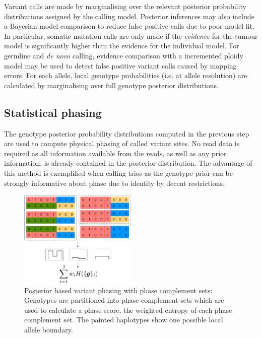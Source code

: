\documentclass[notitlepage, twocolumn]{article}
\begin{document}
Variant calls are made by marginalising over the relevant posterior probability distributions assigned by the calling model. Posterior inferences may also include a Bayesian model comparison to reduce false positive calls due to poor model fit. In particular, somatic mutation calls are only made if the \emph{evidence} for the tumour model is significantly higher than the evidence for the individual model. For germline and \textit{de novo} calling, evidence comparison with a incremented ploidy model may be used to detect false positive variant calls caused by mapping errors. For each allele, local genotype probabilities (i.e. at allele resolution) are calculated by marginalising over full genotype posterior distributions.

\subsection*{Statistical phasing}

The genotype posterior probability distributions computed in the previous step are used to compute physical phasing of called variant sites. No read data is required as all information available from the reads, as well as any prior information, is already contained in the posterior distribution. The advantage of this method is exemplified when calling trios as the genotype prior can be strongly informative about phase due to identity by decent restrictions.

\begin{figure}[ht]
\centering
\includegraphics[width=0.5\textwidth]{figures/phasing}
\caption{Posterior based variant phasing with phase complement sets: Genotypes are partitioned into phase complement sets which are used to calculate a phase score, the weighted entropy of each phase complement set. The painted haplotypes show one possible local allele boundary.}
\label{fig:phasing}
\vspace{-1.5em}
\end{figure}
\end{document}

